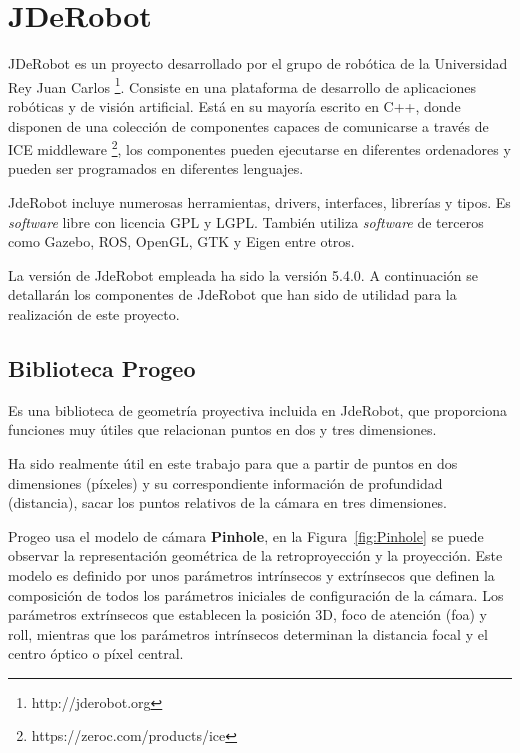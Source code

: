 \section{JDeRobot}

JDeRobot es un proyecto desarrollado por el grupo de robótica de la Universidad Rey Juan Carlos \footnote{http://jderobot.org}. Consiste en una plataforma de desarrollo de aplicaciones robóticas y de visión artificial. Está en su mayoría escrito en C++, donde disponen de una colección de componentes capaces de comunicarse a través de ICE middleware \footnote{https://zeroc.com/products/ice}, los componentes pueden ejecutarse en diferentes ordenadores y pueden ser programados en diferentes lenguajes.

JdeRobot incluye numerosas herramientas, drivers, interfaces, librerías y tipos. Es \textit{software} libre con licencia GPL y LGPL. También utiliza \textit{software} de terceros como Gazebo, ROS, OpenGL, GTK y Eigen entre otros.

La versión de JdeRobot empleada ha sido la versión 5.4.0. A continuación se detallarán los componentes de JdeRobot que han sido de utilidad para la realización de este proyecto.

\subsection{Biblioteca Progeo}

Es una biblioteca de geometría proyectiva incluida en JdeRobot, que proporciona funciones muy útiles que relacionan puntos en dos y tres dimensiones.

Ha sido realmente útil en este trabajo para que a partir de puntos en dos dimensiones (píxeles) y su correspondiente información de profundidad (distancia), sacar los puntos relativos de la cámara en tres dimensiones.

Progeo usa el modelo de cámara \textbf{Pinhole}, en la Figura~\ref{fig:Pinhole} se puede observar la representación geométrica de la retroproyección y la proyección. Este modelo es definido por unos parámetros intrínsecos y extrínsecos que definen la composición de todos los parámetros iniciales de configuración de la cámara. Los parámetros extrínsecos que establecen la posición 3D, foco de atención (foa) y roll, mientras que los parámetros intrínsecos determinan la distancia focal y el centro óptico o píxel central.

